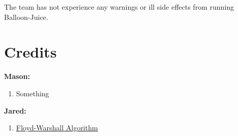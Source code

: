 \documentclass{article}
\begin{document}
The team has not experience any warnings or ill side effects from running Balloon-Juice.

\newpage

\section{Credits}

\begin{flushleft}
\textbf{Mason:}

\begin{enumerate}
\item Something
\end{enumerate}

\textbf{Jared:}


\begin{enumerate}
\item \href{https://en.wikipedia.org/wiki/Floyd-Warshall_algorithm}{Floyd-Warshall Algorithm}
\end{enumerate}
\end{flushleft}
\item 
\end{document}
